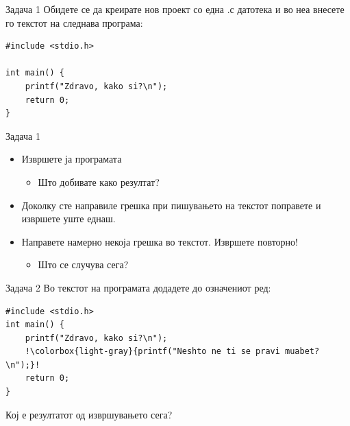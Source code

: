\begin{frame}[fragile]{Задача 1}
Обидете се да креирате нов проект со една .с датотека и во неа внесете го
текстот на следнава програма:
\begin{lstlisting}
#include <stdio.h>

int main() {
    printf("Zdravo, kako si?\n");
    return 0;
}
\end{lstlisting}

\end{frame}

\begin{frame}{Задача 1}
\begin{itemize}
  \item Извршете ја програмата
\begin{itemize}
  \item Што добивате како резултат?
\end{itemize}
  \item Доколку сте направиле грешка при пишувањето на текстот поправете и
  извршете уште еднаш. 
  \item Направете намерно некоја грешка во текстот. Извршете повторно!
\begin{itemize}
  \item Што се случува сега?
\end{itemize}
\end{itemize}
\end{frame}

\begin{frame}[fragile]{Задача 2}
Во текстот на програмата додадете до означениот ред:
\begin{lstlisting}[escapechar=!]
#include <stdio.h>
int main() {
    printf("Zdravo, kako si?\n");
    !\colorbox{light-gray}{printf("Neshto ne ti se pravi muabet?\n");}!
    return 0;
}
\end{lstlisting}
Кој е резултатот од извршувањето сега?
\end{frame}
